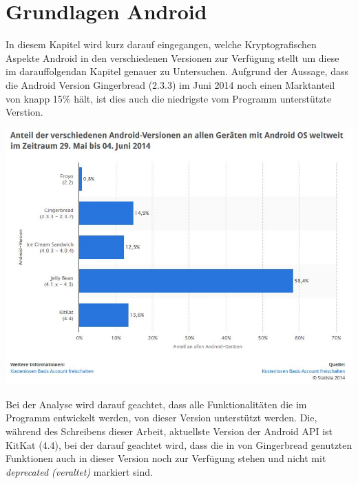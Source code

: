 \documentclass[10pt, a4paper]{scrreprt}
\begin{document}
\chapter{Grundlagen Android}
In diesem Kapitel wird kurz darauf eingegangen, welche Kryptografischen Aspekte Android in den verschiedenen Versionen zur Verfügung stellt um diese im darauffolgendan Kapitel genauer zu Untersuchen. Aufgrund der Aussage, dass die Android Version Gingerbread (2.3.3) im Juni 2014 noch einen Marktanteil von knapp 15\% hält, ist dies auch die niedrigste vom Programm unterstützte Verstion. \\
\begin{center}
\includegraphics[scale=0.6]{android_version_marktanteil.JPG} %
\end{center}
Bei der Analyse wird darauf geachtet, dass alle Funktionalitäten die im Programm entwickelt werden, von dieser Version unterstützt werden. Die, während des Schreibens dieser Arbeit, aktuellste Version der Android API ist KitKat (4.4), bei der darauf geachtet wird, dass die in von Gingerbread genutzten Funktionen auch in dieser Version noch zur Verfügung stehen und nicht mit \textit{deprecated (veraltet)} markiert sind.
\end{document}
